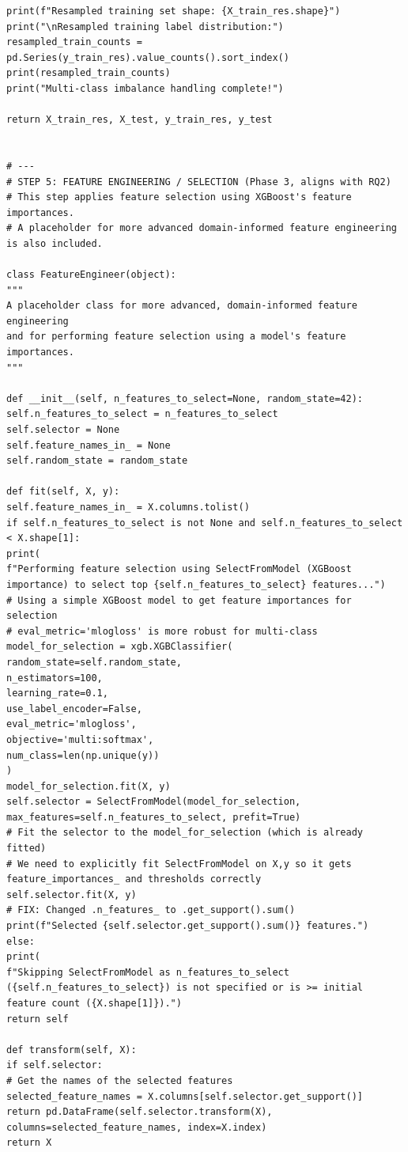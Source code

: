 \begin{lstlisting}[caption={Complete pipeline of XGBoost using CIC-IDS2017 in NIDS using Python}, label={lst:python-pipeline}]
print(f"Resampled training set shape: {X_train_res.shape}")
print("\nResampled training label distribution:")
resampled_train_counts = pd.Series(y_train_res).value_counts().sort_index()
print(resampled_train_counts)
print("Multi-class imbalance handling complete!")

return X_train_res, X_test, y_train_res, y_test


# ---
# STEP 5: FEATURE ENGINEERING / SELECTION (Phase 3, aligns with RQ2)
# This step applies feature selection using XGBoost's feature importances.
# A placeholder for more advanced domain-informed feature engineering is also included.

class FeatureEngineer(object):
"""
A placeholder class for more advanced, domain-informed feature engineering
and for performing feature selection using a model's feature importances.
"""

def __init__(self, n_features_to_select=None, random_state=42):
self.n_features_to_select = n_features_to_select
self.selector = None
self.feature_names_in_ = None
self.random_state = random_state

def fit(self, X, y):
self.feature_names_in_ = X.columns.tolist()
if self.n_features_to_select is not None and self.n_features_to_select < X.shape[1]:
print(
f"Performing feature selection using SelectFromModel (XGBoost importance) to select top {self.n_features_to_select} features...")
# Using a simple XGBoost model to get feature importances for selection
# eval_metric='mlogloss' is more robust for multi-class
model_for_selection = xgb.XGBClassifier(
random_state=self.random_state,
n_estimators=100,
learning_rate=0.1,
use_label_encoder=False,
eval_metric='mlogloss',
objective='multi:softmax',
num_class=len(np.unique(y))
)
model_for_selection.fit(X, y)
self.selector = SelectFromModel(model_for_selection, max_features=self.n_features_to_select, prefit=True)
# Fit the selector to the model_for_selection (which is already fitted)
# We need to explicitly fit SelectFromModel on X,y so it gets feature_importances_ and thresholds correctly
self.selector.fit(X, y)
# FIX: Changed .n_features_ to .get_support().sum()
print(f"Selected {self.selector.get_support().sum()} features.")
else:
print(
f"Skipping SelectFromModel as n_features_to_select ({self.n_features_to_select}) is not specified or is >= initial feature count ({X.shape[1]}).")
return self

def transform(self, X):
if self.selector:
# Get the names of the selected features
selected_feature_names = X.columns[self.selector.get_support()]
return pd.DataFrame(self.selector.transform(X), columns=selected_feature_names, index=X.index)
return X


\end{lstlisting}
